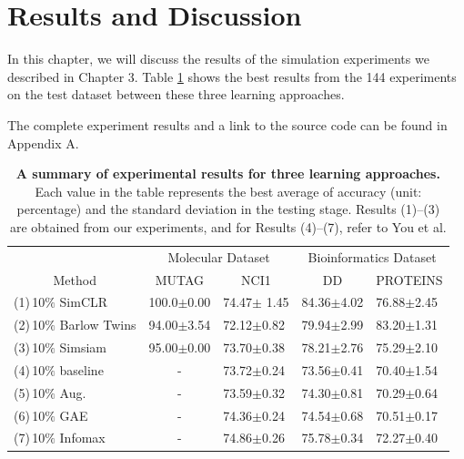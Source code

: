 
\section{Results and Discussion}\label{sec:4}


In this chapter, we will discuss the results of the simulation experiments we described in Chapter 3. Table \ref{tab:result} shows the best results from the 144 experiments on the test dataset between these three learning approaches.


The complete experiment results and a link to the source code can be found in Appendix A. 

\begin{table}[!htbp]
\centering
\begin{tabular}{l|ll|ll}
\toprule
\multicolumn{1}{c|}{}       & \multicolumn{2}{c|}{Molecular Dataset}                & \multicolumn{2}{c}{Bioinformatics Dataset}           \\ \cline{2-5} 
\multicolumn{1}{c|}{Method} & \multicolumn{1}{c}{MUTAG} & \multicolumn{1}{c|}{NCI1} & \multicolumn{1}{c}{DD} & \multicolumn{1}{c}{PROTEINS} \\ \midrule
(1)\,10$\%$ SimCLR                 & 100.0$\pm$0.00             & 74.47$\pm$ 1.45            & 84.36$\pm$4.02           & 76.88$\pm$2.45                \\
(2)\,10$\%$ Barlow Twins           & 94.00$\pm$3.54              & 72.12$\pm$0.82              & 79.94$\pm$2.99           & 83.20$\pm$1.31                \\
(3)\,10$\%$ Simsiam                & 95.00$\pm$0.00              & 73.70$\pm$0.38              & 78.21$\pm$2.76           & 75.29$\pm$2.10                \\ \midrule
(4)\,10$\%$ baseline               & \multicolumn{1}{c}{-}     & 73.72$\pm$0.24              & 73.56$\pm$0.41           & 70.40$\pm$1.54                \\
(5)\,10$\%$ Aug.                   & \multicolumn{1}{c}{-}                         & 73.59$\pm$0.32              & 74.30$\pm$0.81           & 70.29$\pm$0.64                \\
(6)\,10$\%$ GAE                    & \multicolumn{1}{c}{-}                         & 74.36$\pm$0.24              & 74.54$\pm$0.68           & 70.51$\pm$0.17                \\
(7)\,10$\%$ Infomax                & \multicolumn{1}{c}{-}                        & 74.86$\pm$0.26              & 75.78$\pm$0.34           & 72.27$\pm$0.40  
\\
\bottomrule
\end{tabular}
\vspace{0.5cm}
\caption[A summary of experimental results in three learning approaches]{\textbf{A summary of experimental results for three learning approaches.} Each value in the table represents the best average of accuracy (unit: percentage) and the standard deviation in the testing stage. Results (1)–(3) are obtained from our experiments, and for Results (4)–(7), refer to You et al. \cite{GraphCL}}
		\label{tab:result}
\end{table}




